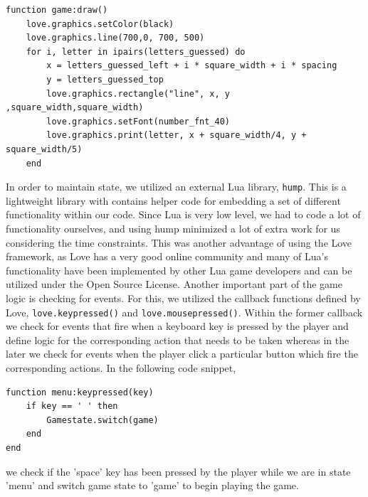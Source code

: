 \begin{minipage}[t]{1\linewidth}
\begin{lstlisting}[language={[5.2]Lua}, %
  title={Game State}, label=game]
	function game:draw()
    love.graphics.setColor(black)
    love.graphics.line(700,0, 700, 500)
    for i, letter in ipairs(letters_guessed) do
        x = letters_guessed_left + i * square_width + i * spacing
        y = letters_guessed_top
        love.graphics.rectangle("line", x, y ,square_width,square_width)
        love.graphics.setFont(number_fnt_40)
        love.graphics.print(letter, x + square_width/4, y + square_width/5)
    end

\end{lstlisting}
\end{minipage}

In order to maintain state, we utilized an external Lua library, \texttt{hump}. This is a lightweight library with contains helper code for embedding a set of different functionality within our code. Since Lua is very low level, we had to code a lot of functionality ourselves, and using hump minimized a lot of extra work for us considering the time constraints. This was another advantage of using the Love framework, as Love has a very good online community and many of Lua's functionality have been implemented by other Lua game developers and can be utilized under the Open Source License.
Another important part of the game logic is checking for events. For this, we utilized the callback functions defined by Love, \texttt{love.keypressed()} and \texttt{love.mousepressed()}. Within the former callback we check for events that fire when a keyboard key is pressed by the player and define logic for the corresponding action that needs to be taken whereas in the later we check for events when the player click a particular button which fire the corresponding actions. In the following code snippet,
	
\begin{minipage}[t]{1\linewidth}
\begin{lstlisting}[language={[5.2]Lua}, %
  title={Keypressed Event}, label=keypressed]
	function menu:keypressed(key)
    if key == ' ' then
        Gamestate.switch(game)
    end
end

\end{lstlisting}
\end{minipage}
we check if the 'space' key has been pressed by the player while we are in state 'menu' and switch game state to 'game' to begin playing the game.
